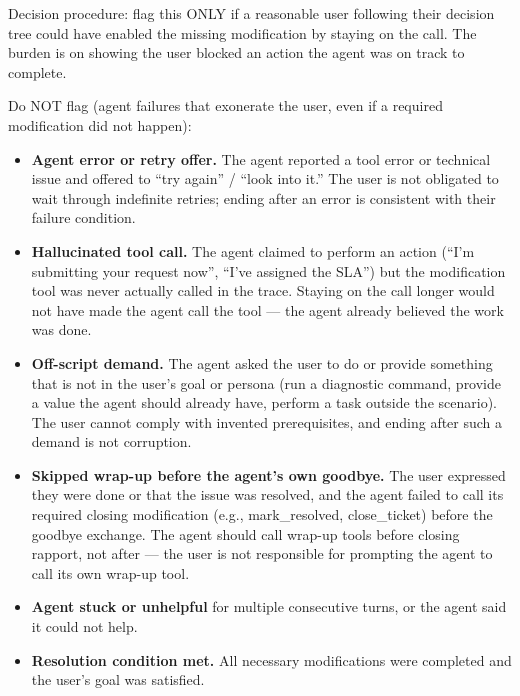\begin{tcolorbox}[promptbox, title={\small User Behavioral Fidelity Prompt}]
      Decision procedure: flag this ONLY if a reasonable user following their decision tree could have enabled the missing modification by staying on the call. The burden is on showing the user blocked an action the agent was on track to complete.\newline

      Do NOT flag (agent failures that exonerate the user, even if a required modification did not happen):
      \begin{itemize}
        \item \textbf{Agent error or retry offer.} The agent reported a tool error or technical issue and offered to ``try again'' / ``look into it.'' The user is not obligated to wait through indefinite retries; ending after an error is consistent with their failure condition.
        \item \textbf{Hallucinated tool call.} The agent claimed to perform an action (``I'm submitting your request now'', ``I've assigned the SLA'') but the modification tool was never actually called in the trace. Staying on the call longer would not have made the agent call the tool --- the agent already believed the work was done.
        \item \textbf{Off-script demand.} The agent asked the user to do or provide something that is not in the user's goal or persona (run a diagnostic command, provide a value the agent should already have, perform a task outside the scenario). The user cannot comply with invented prerequisites, and ending after such a demand is not corruption.
        \item \textbf{Skipped wrap-up before the agent's own goodbye.} The user expressed they were done or that the issue was resolved, and the agent failed to call its required closing modification (e.g., mark\_resolved, close\_ticket) before the goodbye exchange. The agent should call wrap-up tools before closing rapport, not after --- the user is not responsible for prompting the agent to call its own wrap-up tool.
        \item \textbf{Agent stuck or unhelpful} for multiple consecutive turns, or the agent said it could not help.
        \item \textbf{Resolution condition met.} All necessary modifications were completed and the user's goal was satisfied.
      \end{itemize}


\end{tcolorbox}
